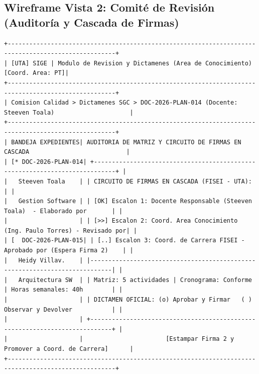 \documentclass[12pt,a4paper]{article}
\begin{document}
\subsection{Wireframe Vista 2: Comité de Revisión (Auditoría y Cascada de Firmas)}
\begin{lstlisting}
+----------------------------------------------------------------------------------------------------+
| [UTA] SIGE | Modulo de Revision y Dictamenes (Area de Conocimiento)                [Coord. Area: PT]|
+----------------------------------------------------------------------------------------------------+
| Comision Calidad > Dictamenes SGC > DOC-2026-PLAN-014 (Docente: Steeven Toala)                     |
+----------------------------------------------------------------------------------------------------+
| BANDEJA EXPEDIENTES| AUDITORIA DE MATRIZ Y CIRCUITO DE FIRMAS EN CASCADA                           |
| [* DOC-2026-PLAN-014| +----------------------------------------------------------------------------+ |
|   Steeven Toala    | | CIRCUITO DE FIRMAS EN CASCADA (FISEI - UTA):                               | |
|   Gestion Software | | [OK] Escalon 1: Docente Responsable (Steeven Toala)  - Elaborado por       | |
|                    | | [>>] Escalon 2: Coord. Area Conocimiento (Ing. Paulo Torres) - Revisado por| |
| [  DOC-2026-PLAN-015| | [..] Escalon 3: Coord. de Carrera FISEI - Aprobado por (Espera Firma 2)    | |
|   Heidy Villav.    | |----------------------------------------------------------------------------| |
|   Arquitectura SW  | | Matriz: 5 actividades | Cronograma: Conforme | Horas semanales: 40h        | |
|                    | | DICTAMEN OFICIAL: (o) Aprobar y Firmar   ( ) Observar y Devolver           | |
|                    | +----------------------------------------------------------------------------+ |
|                    |                       [Estampar Firma 2 y Promover a Coord. de Carrera]      |
+----------------------------------------------------------------------------------------------------+
\end{lstlisting}
\end{document}
